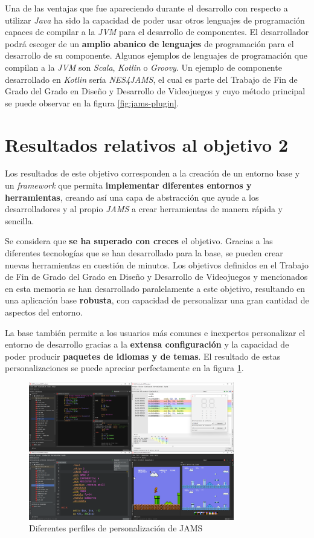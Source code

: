 Una de las ventajas que fue apareciendo durante el
desarrollo con respecto a utilizar \textit{Java} ha sido la
capacidad de poder usar otros lenguajes de programación capaces
de compilar a la \textit{JVM} para el desarrollo de componentes.
El desarrollador podrá escoger de un \textbf{amplio abanico de lenguajes}
de programación para el desarrollo de su componente.
Algunos ejemplos de lenguajes de programación que compilan a la \textit{JVM}
son \textit{Scala}, \textit{Kotlin} o \textit{Groovy}.
Un ejemplo de componente desarrollado en \textit{Kotlin} sería
\textit{NES4JAMS}, el cual es parte del Trabajo de Fin de Grado del Grado en
Diseño y Desarrollo de Videojuegos y cuyo método principal se puede observar
en la figura \ref{fig:jams-plugin}.


\section{Resultados relativos al objetivo 2}\label{sec:resultados-relativos-al-objetivo-2}

Los resultados de este objetivo corresponden a la creación de
un entorno base y un \textit{framework} que permita \textbf{implementar
diferentes entornos y herramientas}, creando así una capa
de abstracción que ayude a los desarrolladores y al propio
\textit{JAMS} a crear herramientas de manera rápida y sencilla.

Se considera que \textbf{se ha superado con creces}
el objetivo.
Gracias a las diferentes tecnologías que se han desarrollado
para la base, se pueden crear nuevas herramientas en cuestión
de minutos.
Los objetivos definidos en el Trabajo de Fin de Grado del Grado en
Diseño y Desarrollo de Videojuegos y mencionados en esta memoria
se han desarrollado paralelamente a este objetivo, resultando
en una aplicación base \textbf{robusta}, con capacidad de personalizar
una gran cantidad de aspectos del entorno.

La base también permite a los usuarios más comunes e
inexpertos personalizar el entorno de desarrollo gracias a la
\textbf{extensa configuración} y la capacidad de poder producir
\textbf{paquetes de idiomas y de temas}.
El resultado de estas personalizaciones se puede apreciar
perfectamente en la figura \ref{fig:jams-collage}.

\begin{figure}[h]
    \centering
    \includegraphics[width=0.8\textwidth]{images/result/jams-collage}
    \caption{Diferentes perfiles de personalización de JAMS}
    \label{fig:jams-collage}
\end{figure}

